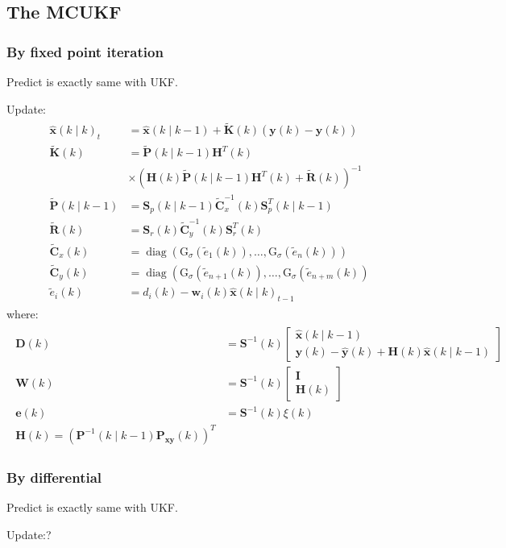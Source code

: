\documentclass[dvipdfmx]{jsarticle}
\begin{document}
\subsection*{The MCUKF}
\subsubsection*{By fixed point iteration}
Predict is exactly same with UKF.

Update:
\begin{equation}\nonumber\label{Func.}\begin{aligned}
  \begin{aligned}
    \widehat{\mathbf{x}}(k \mid k)_{t}&= \widehat{\mathbf{x}}(k \mid k-1)+\widetilde{\mathbf{K}}(k)(\mathbf{y}(k)-\widehat{\mathbf{y}}(k)) \\
    \widetilde{\mathbf{K}}(k)&= \widetilde{\mathbf{P}}(k \mid k-1) \mathbf{H}^{T}(k) \\
    & \times\left(\mathbf{H}(k) \widetilde{\mathbf{P}}(k \mid k-1) \mathbf{H}^{T}(k)+\widetilde{\mathbf{R}}(k)\right)^{-1} \\
    \widetilde{\mathbf{P}}(k \mid k-1)&= \mathbf{S}_{p}(k \mid k-1) \widetilde{\mathbf{C}}_{x}^{-1}(k) \mathbf{S}_{p}^{T}(k \mid k-1) \\
    \widetilde{\mathbf{R}}(k)&= \mathbf{S}_{r}(k) \widetilde{\mathbf{C}}_{y}^{-1}(k) \mathbf{S}_{r}^{T}(k) \\
    \widetilde{\mathbf{C}}_{x}(k)&= \operatorname{diag}\left(\mathrm{G}_{\sigma}\left(\widetilde{e}_{1}(k)\right), \ldots, \mathrm{G}_{\sigma}\left(\widetilde{e}_{n}(k)\right)\right) \\
    \widetilde{\mathbf{C}}_{y}(k)&= \operatorname{diag}\left(\mathrm{G}_{\sigma}\left(\widetilde{e}_{n+1}(k)\right), \ldots, \mathrm{G}_{\sigma}\left(\widetilde{e}_{n+m}(k)\right)\right.\\
    \widetilde{e}_{i}(k) &=d_{i}(k)-\mathbf{w}_{i}(k) \widehat{\mathbf{x}}(k \mid k)_{t-1}
    \end{aligned}
\end{aligned}\end{equation}
where:
\begin{equation}\nonumber\label{Func.}\begin{aligned}
  \begin{aligned}
    \mathbf{D}(k) &=\mathbf{S}^{-1}(k)\left[\begin{array}{c}
    \widehat{\mathbf{x}}(k \mid k-1) \\
    \mathbf{y}(k)-\widehat{\mathbf{y}}(k)+\mathbf{H}(k) \widehat{\mathbf{x}}(k \mid k-1)
    \end{array}\right] \\
    \mathbf{W}(k) &=\mathbf{S}^{-1}(k)\left[\begin{array}{c}
    \mathbf{I} \\
    \mathbf{H}(k)
    \end{array}\right] \\
    \mathbf{e}(k) &=\mathbf{S}^{-1}(k) \xi(k) \\
    \mathbf{H}(k)=\left(\mathbf{P}^{-1}(k \mid k-1) \mathbf{P}_{\mathbf{x y}}(k)\right)^{T}
    \end{aligned}
\end{aligned}\end{equation}
\subsubsection*{By differential}
Predict is exactly same with UKF.

Update:?
\end{document}
